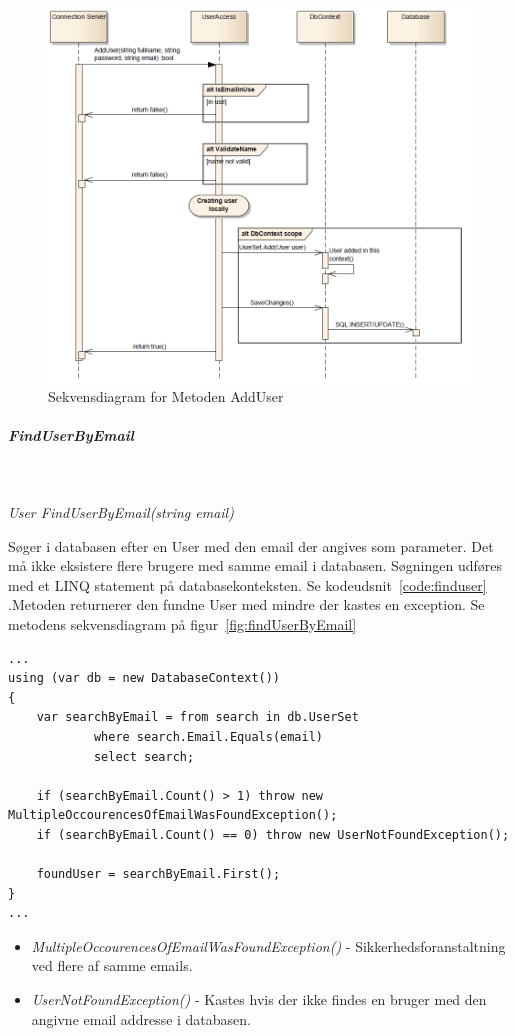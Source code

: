 \begin{figure}
\centering
\includegraphics[width=0.7\linewidth]{figs/dbSeq/adduser.PNG}
\caption{Sekvensdiagram for Metoden AddUser}
\label{fig:adduser}
\end{figure}


\subparagraph{FindUserByEmail}\

\textit{User FindUserByEmail(string email)}

Søger i databasen efter en User med den email der angives som parameter. Det må ikke eksistere flere brugere med samme email i databasen. Søgningen udføres med et LINQ statement på databasekonteksten. Se kodeudsnit~\ref{code:finduser} .Metoden returnerer den fundne User med mindre der kastes en exception.
Se metodens sekvensdiagram på figur~\ref{fig:findUserByEmail}

\begin{lstlisting}[caption=Kodeudsnit fra metoden FindUserByEmail, label=code:finduser]
...
using (var db = new DatabaseContext())
{
	var searchByEmail = from search in db.UserSet
			where search.Email.Equals(email)
			select search;

	if (searchByEmail.Count() > 1) throw new    	MultipleOccourencesOfEmailWasFoundException();
	if (searchByEmail.Count() == 0) throw new UserNotFoundException();

	foundUser = searchByEmail.First();
}
...	
\end{lstlisting}


\begin{itemize}
	\item \textit{MultipleOccourencesOfEmailWasFoundException()} - Sikkerhedsforanstaltning ved flere af samme emails.
	\item \textit{UserNotFoundException()} - Kastes hvis der ikke findes en bruger med den angivne email addresse i databasen.
\end{itemize}

